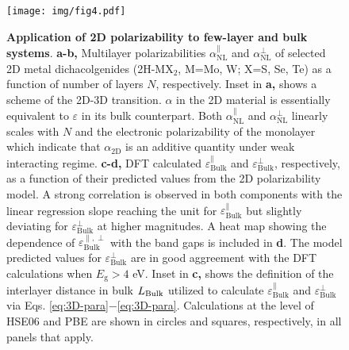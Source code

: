 \documentclass[journal=ancac3,manuscript=article,email=true,hyperref=true,keywords=false]{achemso}
\begin{document}
\begin{figure}[H]
\centering
\texttt{[image: img/fig4.pdf]}
\caption{\label{fig-4} \textbf{Application of 2D polarizability to
    few-layer and bulk systems}.  \textbf{a-b,} Multilayer
  polarizabilities $\alpha_{\mathrm{NL}}^{\parallel}$ and
  $\alpha_{\mathrm{NL}}^{\perp}$ of selected 2D metal 
  dichacolgenides (2H-MX$_2$, M=Mo, W; X=S, Se, Te)
  as a function of number of layers $N$, respectively.  
  Inset in {\bf a,} shows a 
   scheme of the 2D-3D transition. 
  $\alpha$ in the 2D material is essentially equivalent to
  $\varepsilon$ in its bulk counterpart.  
  Both $\alpha_{\mathrm{NL}}^{\parallel}$
  and $\alpha_{\mathrm{NL}}^{\perp}$ linearly scales with $N$ and the
  electronic polarizability of the monolayer which indicate that
  $\alpha_{\mathrm{2D}}$ is an additive quantity under weak
  interacting regime. 
  {\bf c-d,} DFT calculated $\varepsilon_{\mathrm{Bulk}}^{\parallel}$ and 
  $\varepsilon_{\mathrm{Bulk}}^{\perp}$, respectively, as a function of 
  their predicted values from the 2D polarizability model. A strong correlation 
  is observed in both components with the linear regression slope reaching the 
  unit for $\varepsilon_{\mathrm{Bulk}}^{\parallel}$ but slightly deviating for 
  $\varepsilon_{\mathrm{Bulk}}^{\perp}$ at higher magnitudes. 
  A heat map showing the dependence of $\varepsilon_{\mathrm{Bulk}}^{\parallel,\perp}$
   with the band gaps is included in {\bf d}. The model predicted values for $\varepsilon_{\mathrm{Bulk}}^{\perp}$ are in good aggreement with the DFT calculations when
  $E_{\mathrm{g}}>4$ eV. Inset in {\bf c,} shows the definition 
  of the interlayer distance in bulk $L_{\rm Bulk}$
  utilized to calculate $\varepsilon_{\mathrm{Bulk}}^{\parallel}$ and 
  $\varepsilon_{\mathrm{Bulk}}^{\perp}$ via Eqs. \ref{eq:3D-para}$-$\ref{eq:3D-para}.  %
  Calculations at the level of HSE06 and PBE are shown in circles and 
  squares, respectively, in all panels that apply. 
  }
\end{figure}
\end{document}
